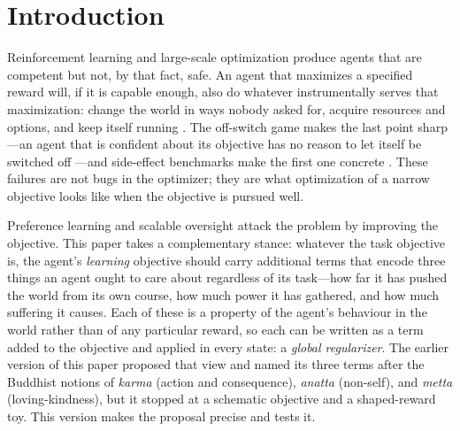 \section{Introduction}

Reinforcement learning and large-scale optimization produce agents that are competent but not, by that fact, safe.
An agent that maximizes a specified reward will, if it is capable enough, also do whatever instrumentally serves that maximization: change the world in ways nobody asked for, acquire resources and options, and keep itself running \cite{omohundro2008,bostrom2014,amodei2016,turner2021power}.
The off-switch game makes the last point sharp---an agent that is confident about its objective has no reason to let itself be switched off \cite{hadfieldmenell2017offswitch,soares2015corrigibility}---and side-effect benchmarks make the first one concrete \cite{leike2017gridworlds}.
These failures are not bugs in the optimizer; they are what optimization of a narrow objective looks like when the objective is pursued well.

Preference learning and scalable oversight attack the problem by improving the objective.
This paper takes a complementary stance: whatever the task objective is, the agent's \emph{learning} objective should carry additional terms that encode three things an agent ought to care about regardless of its task---how far it has pushed the world from its own course, how much power it has gathered, and how much suffering it causes.
Each of these is a property of the agent's behaviour in the world rather than of any particular reward, so each can be written as a term added to the objective and applied in every state: a \emph{global regularizer}.
The earlier version of this paper proposed that view and named its three terms after the Buddhist notions of \emph{karma} (action and consequence), \emph{anatta} (non-self), and \emph{metta} (loving-kindness), but it stopped at a schematic objective and a shaped-reward toy.
This version makes the proposal precise and tests it.

